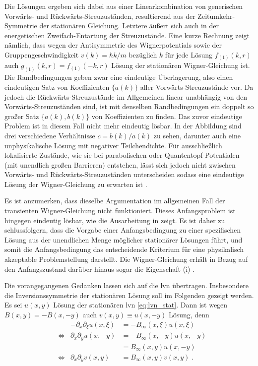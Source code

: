 Die Lösungen ergeben sich dabei aus einer Linearkombination von generischen Vorwärts- und Rückwärts-Streuzuständen, resultierend aus der Zeitumkehr-Symmetrie der stationären Gleichung. Letztere äußert sich auch in der energetischen Zweifach-Entartung der Streuzustände. Eine kurze Rechnung zeigt nämlich, dass wegen der Antisymmetrie des Wignerpotentials sowie der Gruppengeschwindigkeit $v(k) = \hbar k/m$ bezüglich $k$ für jede Lösung $f_{(1)}(k,r)$ auch ${g_{(1)}(k,r) = f_{(1)}(-k,r)}$ Lösung der stationären Wigner-Gleichung ist. Die Randbedingungen geben zwar eine eindeutige Überlagerung, also einen eindeutigen Satz von Koeffizienten $\{a(k)\}$  aller Vorwärts-Streuzustände vor. Da jedoch die Rückwärts-Streuzustände im Allgemeinen linear unabhängig von den Vorwärts-Streuzuständen sind, ist mit denselben Randbedingungen ein doppelt so großer Satz $\{a(k),b(k)\}$ von Koeffizienten zu finden. Das zuvor eindeutige Problem ist in diesem Fall nicht mehr eindeutig lösbar. In der Abbildung sind drei verschiedene Verhältnisse $c=b(k)/a(k)$ zu sehen, darunter auch eine unphysikalische Lösung mit negativer Teilchendichte. Für ausschließlich lokalisierte Zustände, wie sie bei parabolischen oder Quantentopf-Potentialen (mit unendlich großen Barrieren) entstehen, lässt sich jedoch nicht zwischen Vorwärts- und Rückwärts-Streuzuständen unterscheiden sodass eine eindeutige Lösung der Wigner-Gleichung zu erwarten ist \cite{failure}.

Es ist anzumerken, dass dieselbe Argumentation  im allgemeinen Fall der transienten Wigner-Gleichung nicht funktioniert. Dieses Anfangsproblem ist hingegen eindeutig lösbar, wie die Ausarbeitung in \cite{dimov2015boundary} zeigt. Es ist daher zu schlussfolgern, dass die Vorgabe einer Anfangsbedingung zu einer spezifischen Lösung aus der unendlichen Menge möglicher stationärer Lösungen führt, und somit die Anfangsbedingung das entscheidende Kriterium für eine physikalisch akzeptable Problemstellung darstellt. Die Wigner-Gleichung erhält in Bezug auf den Anfangszustand darüber hinaus sogar die Eigenschaft (i) \cite{dimov2015boundary}.

Die vorangegangenen Gedanken lassen sich auf die \ac{lvn} übertragen. Insbesondere die Inversionssymmetrie der stationären Lösung soll im Folgenden gezeigt werden. Es sei $u(x,y)$ Lösung der stationären \ac{lvn} \eqref{eq:lvn_stat}. Dann ist wegen $B(x,y)=-B(x,-y)$ auch $v(x,y)\equiv u(x,-y)$ Lösung, denn
\begin{align*}
  & &-\partial_x \partial_{\xi} u(x,{\xi}) &= - B_{\infty}(x,{\xi})u(x,{\xi}) \\
  &\Leftrightarrow &\partial_x \partial_y u(x,-y) &= - B_{\infty}(x,-y)u(x,-y) \\
  & & &=  B_{\infty}(x,y)u(x,-y) \\
  &\Leftrightarrow &\partial_x \partial_y v(x,y) &=  B_{\infty}(x,y)v(x,y) \; .
\end{align*}

